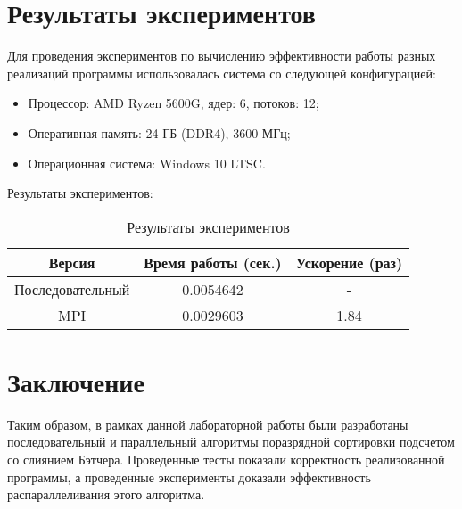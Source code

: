 \documentclass{report}
\begin{document}
\section*{Результаты экспериментов}
Для проведения экспериментов по вычислению эффективности работы разных реализаций программы использовалась система со следующей конфигурацией:
\begin{itemize}
\item Процессор: AMD Ryzen 5600G, ядер: 6, потоков: 12;
\item Оперативная память: 24 ГБ (DDR4), 3600 МГц;
\item Операционная система: Windows 10 LTSC.
\end{itemize}

\par Результаты экспериментов:
\begin{table}[!h]
\centering
\begin{tabular}{| c | c | c |}
\hline
Версия & Время работы (сек.) & Ускорение (раз) \\
\hline
Последовательный        & 0.0054642        & -         \\
MPI        & 0.0029603        & 1.84          \\
\hline
\end{tabular}
\caption{Результаты экспериментов}
\end{table}

\newpage

\section*{Заключение}
Таким образом, в рамках данной лабораторной работы были разработаны последовательный и параллельный алгоритмы поразрядной сортировки подсчетом со слиянием Бэтчера. Проведенные тесты показали корректность реализованной программы, а проведенные эксперименты доказали эффективность распараллеливания этого алгоритма.
\newpage

\end{document}

